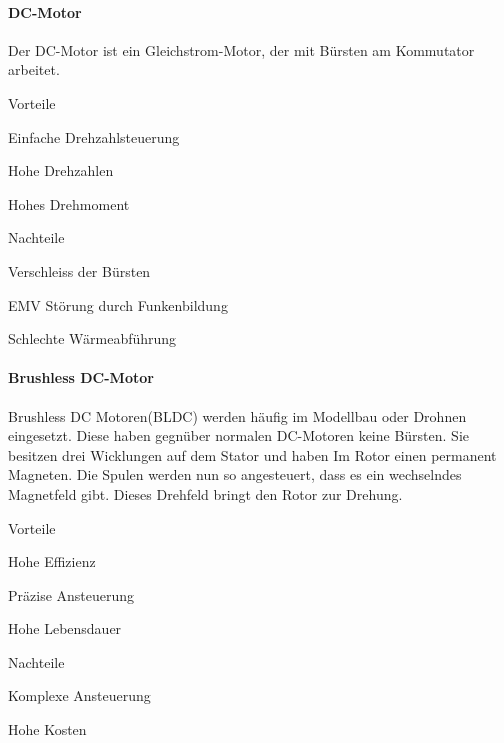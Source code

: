 \paragraph{DC-Motor}

Der DC-Motor ist ein Gleichstrom-Motor, der mit Bürsten am Kommutator arbeitet. 

\begin{minipage}[t]{0.48\textwidth}
\begin{items}
  \item [Vorteile]
  \item Einfache Drehzahlsteuerung
  \item Hohe Drehzahlen
  \item Hohes Drehmoment
\end{items}
\end{minipage}
\hfill
\begin{minipage}[t]{0.48\textwidth}
\begin{items}
  \item [Nachteile]
  \item Verschleiss der Bürsten
  \item EMV Störung durch Funkenbildung
  \item Schlechte Wärmeabführung
\end{items}
\end{minipage}

\paragraph{Brushless DC-Motor}

Brushless DC Motoren(BLDC) werden häufig im Modellbau oder Drohnen eingesetzt. Diese haben gegnüber normalen DC-Motoren keine Bürsten. Sie besitzen drei Wicklungen auf dem Stator und haben Im Rotor einen permanent Magneten. Die Spulen werden nun so angesteuert, dass es ein wechselndes Magnetfeld gibt. Dieses Drehfeld bringt den Rotor zur Drehung. 

\begin{minipage}[t]{0.48\textwidth}
\begin{items}
  \item [Vorteile]
  \item Hohe Effizienz
  \item Präzise Ansteuerung
  \item Hohe Lebensdauer
\end{items}
\end{minipage}
\hfill
\begin{minipage}[t]{0.48\textwidth}
\begin{items}
  \item [Nachteile]
  \item Komplexe Ansteuerung
  \item Hohe Kosten
\end{items}
\end{minipage}


